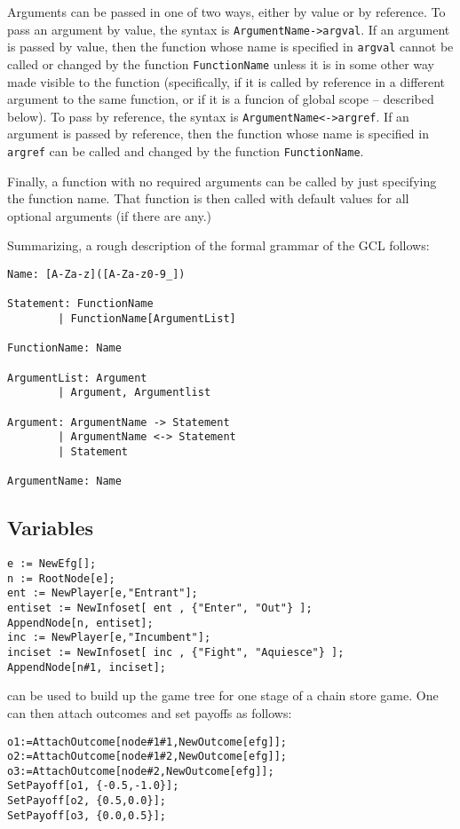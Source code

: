 Arguments can be passed in one of two ways, either by value or by
reference.  To pass an argument by value, the syntax is
\verb+ArgumentName->argval+.  If an argument is passed by value, then the
function whose name is specified in \verb+argval+ cannot be called
or changed by the function \verb+FunctionName+ unless it is in some
other way made visible to the function (specifically, if it is called
by reference in a different argument to the same function, or if it is a
funcion of global scope -- described below).  To pass by reference,
the syntax is \verb+ArgumentName<->argref+.  If an argument is passed
by reference, then the function whose name is specified in
\verb+argref+ can be called and changed by the function
\verb+FunctionName+.  

Finally, a function with no required arguments can be called by just
specifying the function name.  That function is then called with
default values for all optional arguments (if there are any.)

Summarizing, a rough description of the formal grammar of the GCL
follows:

\begin{verbatim}
Name: [A-Za-z]([A-Za-z0-9_])

Statement: FunctionName
        | FunctionName[ArgumentList]

FunctionName: Name

ArgumentList: Argument
        | Argument, Argumentlist

Argument: ArgumentName -> Statement
        | ArgumentName <-> Statement
        | Statement

ArgumentName: Name
\end{verbatim}

\subsection{Variables}




\begin{verbatim}
e := NewEfg[];
n := RootNode[e];
ent := NewPlayer[e,"Entrant"];
entiset := NewInfoset[ ent , {"Enter", "Out"} ];
AppendNode[n, entiset];
inc := NewPlayer[e,"Incumbent"];
inciset := NewInfoset[ inc , {"Fight", "Aquiesce"} ];
AppendNode[n#1, inciset]; 
\end{verbatim}

can be used to build up the game tree for one stage of a chain store
game.  One can then attach outcomes and set payoffs as follows:

\begin{verbatim}
o1:=AttachOutcome[node#1#1,NewOutcome[efg]];
o2:=AttachOutcome[node#1#2,NewOutcome[efg]];
o3:=AttachOutcome[node#2,NewOutcome[efg]];
SetPayoff[o1, {-0.5,-1.0}];
SetPayoff[o2, {0.5,0.0}];
SetPayoff[o3, {0.0,0.5}];
\end{verbatim}

